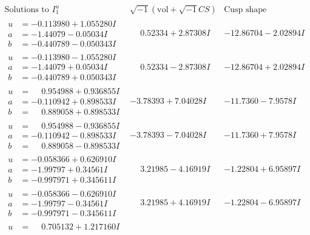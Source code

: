 \documentclass[1p]{elsarticle_modified}
\theoremstyle{definition}
\newcommand{\I}{\sqrt{-1}}
\begin{document}
$$\begin{array}{c|c|c}  
\text{Solutions to }I^u_{1}& \I (\text{vol} + \sqrt{-1}CS) & \text{Cusp shape}\\
 \hline 
\begin{aligned}
u &= -0.113980 + 1.055280 I \\
a &= -1.44079 - 0.05034 I \\
b &= -0.440789 - 0.050343 I\end{aligned}
 & \phantom{-}0.52334 + 2.87308 I & -12.86704 - 2.02894 I \\ \hline\begin{aligned}
u &= -0.113980 - 1.055280 I \\
a &= -1.44079 + 0.05034 I \\
b &= -0.440789 + 0.050343 I\end{aligned}
 & \phantom{-}0.52334 - 2.87308 I & -12.86704 + 2.02894 I \\ \hline\begin{aligned}
u &= \phantom{-}0.954988 + 0.936855 I \\
a &= -0.110942 + 0.898533 I \\
b &= \phantom{-}0.889058 + 0.898533 I\end{aligned}
 & -3.78393 + 7.04028 I & -11.7360 - 7.9578 I \\ \hline\begin{aligned}
u &= \phantom{-}0.954988 - 0.936855 I \\
a &= -0.110942 - 0.898533 I \\
b &= \phantom{-}0.889058 - 0.898533 I\end{aligned}
 & -3.78393 - 7.04028 I & -11.7360 + 7.9578 I \\ \hline\begin{aligned}
u &= -0.058366 + 0.626910 I \\
a &= -1.99797 + 0.34561 I \\
b &= -0.997971 + 0.345611 I\end{aligned}
 & \phantom{-}3.21985 - 4.16919 I & -1.22804 + 6.95897 I \\ \hline\begin{aligned}
u &= -0.058366 - 0.626910 I \\
a &= -1.99797 - 0.34561 I \\
b &= -0.997971 - 0.345611 I\end{aligned}
 & \phantom{-}3.21985 + 4.16919 I & -1.22804 - 6.95897 I \\ \hline\begin{aligned}
u &= \phantom{-}0.705132 + 1.217160 I \\

\end{aligned}
\end{array}$$
\end{document}

